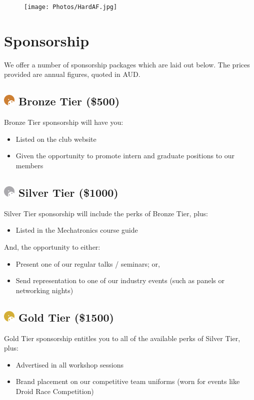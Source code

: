 \documentclass[a4paper,12pt]{report}
\begin{document}
\begin{figure}[H]
    \centering
    \texttt{[image: Photos/HardAF.jpg]}
\end{figure}

\newpage

\section*{Sponsorship}
\large
We offer a number of sponsorship packages which are laid out below. The prices provided are annual figures, quoted in AUD.
\normalsize

\subsection*{
    \includegraphics[width=1em]{Sponsor Icons/Bronze}
    \textcolor{sponsor_bronze}{Bronze Tier (\$500)}
}
Bronze Tier sponsorship will have you:
\begin{itemize}
    \item Listed on the club website
    \item Given the opportunity to promote intern and graduate positions to our members
\end{itemize}

\subsection*{
    \includegraphics[width=1em]{Sponsor Icons/Silver}
    \textcolor{sponsor_silver}{Silver Tier (\$1000)}
}
Silver Tier sponsorship will include the perks of Bronze Tier, plus:
\begin{itemize}
    \item Listed in the Mechatronics course guide
\end{itemize}
And, the opportunity to either:
\begin{itemize}
    \item Present one of our regular talks / seminars; or,
    \item Send representation to one of our industry events (such as panels or networking nights)
\end{itemize}

\subsection*{
    \includegraphics[width=1em]{Sponsor Icons/Gold}
    \textcolor{sponsor_gold}{Gold Tier (\$1500)}
}
Gold Tier sponsorship entitles you to all of the available perks of Silver Tier, plus:
\begin{itemize}
    \item Advertised in all workshop sessions
    \item Brand placement on our competitive team uniforms (worn for events like Droid Race Competition)
\end{itemize}
\end{document}
